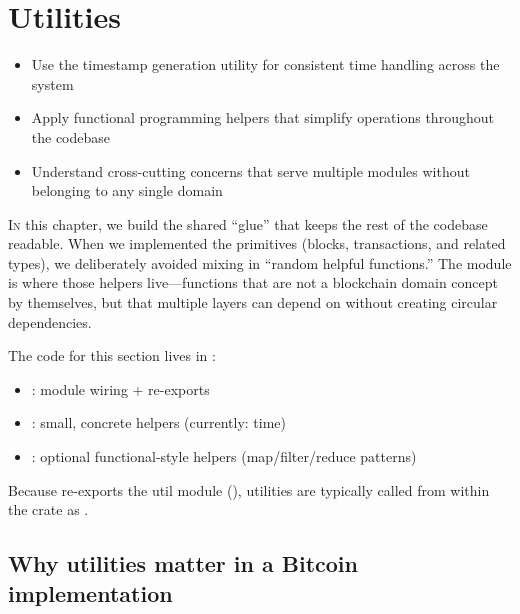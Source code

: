 \chapter{Utilities}
\label{ch:utilities}

\begin{learnbox}
\begin{itemize}
  \item Use the timestamp generation utility for consistent time handling across the system
  \item Apply functional programming helpers that simplify operations throughout the codebase
  \item Understand cross-cutting concerns that serve multiple modules without belonging to any single domain
\end{itemize}
\end{learnbox}

\lettrine{I}{n} this chapter, we build the shared ``glue'' that keeps the rest of the
codebase readable. When we implemented the primitives (blocks, transactions, and related
types), we deliberately avoided mixing in ``random helpful functions.'' The 
module is where those helpers live---functions that are not a blockchain domain concept
by themselves, but that multiple layers can depend on without creating circular
dependencies.

The code for this section lives in :

\begin{itemize}
  \item {}: module wiring + re-exports
  \item {}: small, concrete helpers (currently: time)
  \item {}: optional functional-style helpers (map/filter/reduce patterns)
\end{itemize}

Because  re-exports the util module (),
utilities are typically called from within the crate as .

\section{Why utilities matter in a Bitcoin implementation}
\label{sec:ch07-why-matter}

